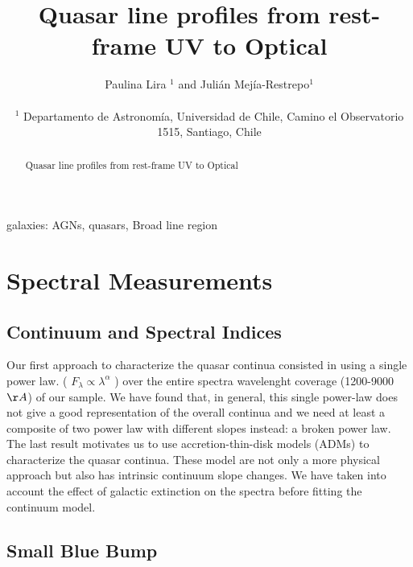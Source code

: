 \documentclass[usenatbib]{mn2e}
\begin{document}
\title[Quasar line profiles from  rest-frame UV to Optical]{Quasar line profiles from rest-frame UV to Optical}    
\author[P. Lira and J.E. Mejia-Restrepo]{
\parbox[t]{\textwidth}{\raggedright 
Paulina Lira $^{1}$ and
Juli\'an Mej\'ia-Restrepo$^{1}$ 
}
\vspace*{6pt}\\
$^{1}$ Departamento de Astronom\'{i}a, Universidad de Chile, Camino el
Observatorio 1515, Santiago, Chile} 

\maketitle

\begin{abstract}
 Quasar line profiles from  rest-frame UV to Optical 
\end{abstract}

\begin{keywords}
{galaxies: AGNs, quasars, Broad line region} 
\end{keywords}


\section{Spectral Measurements}

\subsection{Continuum and Spectral Indices}

Our first approach to characterize the quasar continua consisted in using a single power law. ( $F_{\lambda} \propto \lambda^{\alpha}$ ) over the entire spectra wavelenght coverage (1200-9000$\AA$) of our sample. We have found that, in general, this single power-law does not give a good representation of the overall continua and we need  at least a composite of two power law with different slopes instead: a broken power law.
The last result motivates us to use accretion-thin-disk models (ADMs) to  characterize the quasar continua.  These model are not only a more physical approach but also has intrinsic continuum slope changes. We have  taken into account the effect of galactic extinction on the spectra before fitting the continuum model.




\subsection{Small Blue Bump}
\end{document}
